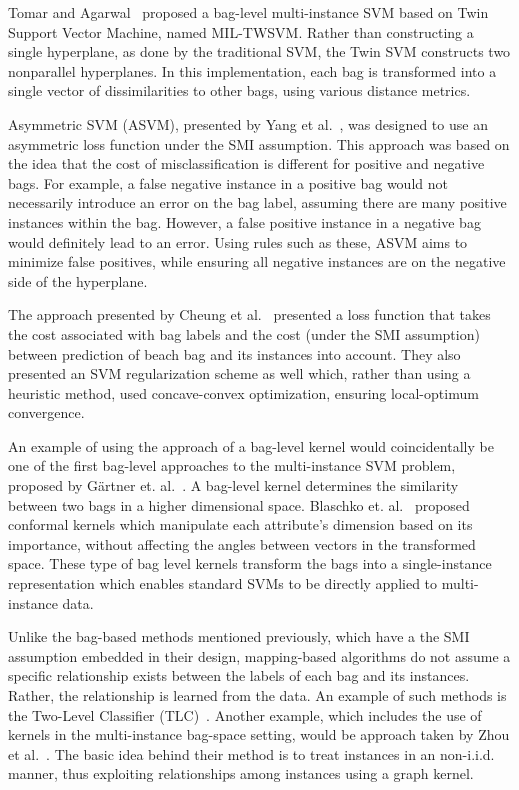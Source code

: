 \documentclass[reqno]{vcuthesis}
\numberwithin{equation}{chapter}
\begin{document}
Tomar and Agarwal~\cite{tomar2017multiple} proposed a bag-level multi-instance SVM based on Twin Support Vector Machine, named MIL-TWSVM. Rather than constructing a single hyperplane, as done by the traditional SVM, the Twin SVM constructs two nonparallel hyperplanes. In this implementation, each bag is transformed into a single vector of dissimilarities to other bags, using various distance metrics.
\newpage

Asymmetric SVM (ASVM), presented by Yang et al.~\cite{Herman2008}, was designed to use an asymmetric loss function under the SMI assumption. This approach was based on the idea that the cost of misclassification is different for positive and negative bags. For example, a false negative instance in a positive bag would not necessarily introduce an error on the bag label, assuming there are many positive instances within the bag. However, a false positive instance in a negative bag would definitely lead to an error. Using rules such as these, ASVM aims to minimize false positives, while ensuring all negative instances are on the negative side of the hyperplane.

The approach presented by Cheung et al.~\cite{cheung2006regularization} presented a loss function that takes the cost associated with bag labels and the cost (under the SMI assumption) between prediction of beach bag and its instances into account. They also presented an SVM regularization scheme as well which, rather than using a heuristic method, used concave-convex optimization, ensuring local-optimum convergence.

An example of using the approach of a bag-level kernel would coincidentally be one of the first bag-level approaches to the multi-instance SVM problem, proposed by G{\"a}rtner et. al.~\cite{Smola2002}. A bag-level kernel determines the similarity between two bags in a higher dimensional space. Blaschko et. al.~\cite{Blaschko2006} proposed conformal kernels which manipulate each attribute's dimension based on its importance, without affecting the angles between vectors in the transformed space. These type of bag level kernels transform the bags into a single-instance representation which enables standard SVMs to be directly applied to multi-instance data. 

Unlike the bag-based methods mentioned previously, which have a the SMI assumption embedded in their design, mapping-based algorithms do not assume a specific relationship exists between the labels of each bag and its instances. Rather, the relationship is learned from the data. An example of such methods is the Two-Level Classifier (TLC)~\cite{Weidmann2003}. Another example, which includes the use of kernels in the multi-instance bag-space setting, would be approach taken by Zhou et al.~\cite{zhou2009multi}. The basic idea behind their method is to treat instances in an non-i.i.d. manner, thus exploiting relationships among instances using a graph kernel. 
\end{document}
